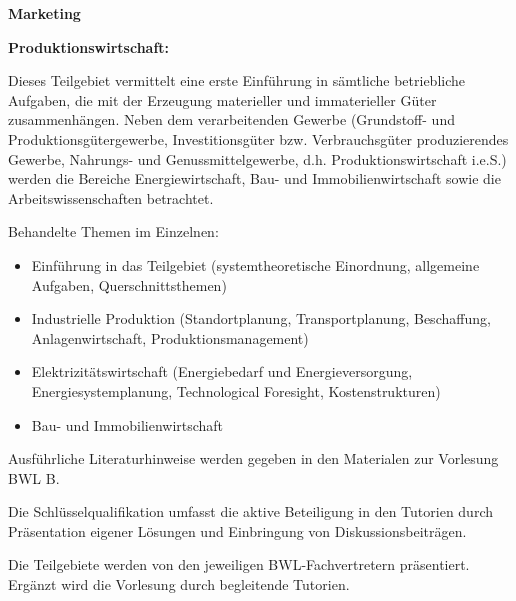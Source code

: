 \begin{course}
\begin{content}
 

\textbf{Marketing}

 

\textbf{Produktionswirtschaft:}

 

Dieses Teilgebiet vermittelt eine erste Einführung in sämtliche betriebliche Aufgaben, die mit der Erzeugung materieller und immaterieller Güter zusammenhängen. Neben dem verarbeitenden Gewerbe (Grundstoff- und Produktionsgütergewerbe, Investitionsgüter bzw. Verbrauchsgüter produzierendes Gewerbe, Nahrungs- und Genussmittelgewerbe, d.h. Produktionswirtschaft i.e.S.) werden die Bereiche Energiewirtschaft, Bau- und Immobilienwirtschaft sowie die Arbeitswissenschaften betrachtet.

 

Behandelte Themen im Einzelnen:

 \begin{itemize}\item Einführung in das Teilgebiet (systemtheoretische Einordnung, allgemeine Aufgaben, Querschnittsthemen)  \item Industrielle Produktion (Standortplanung, Transportplanung, Beschaffung, Anlagenwirtschaft, Produktionsmanagement)  \item Elektrizitätswirtschaft (Energiebedarf und Energieversorgung, Energiesystemplanung, Technological Foresight, Kostenstrukturen)  \item Bau- und Immobilienwirtschaft  \end{itemize}
\end{content}



\begin{literature}Ausführliche Literaturhinweise werden gegeben in den Materialen zur Vorlesung BWL B.

\end{literature}

\begin{remarks}Die Schlüsselqualifikation umfasst die aktive Beteiligung in den Tutorien durch Präsentation eigener Lösungen und Einbringung von Diskussionsbeiträgen.

 

Die Teilgebiete werden von den jeweiligen BWL-Fachvertretern präsentiert. Ergänzt wird die Vorlesung durch begleitende Tutorien.

\end{remarks}

\end{course}